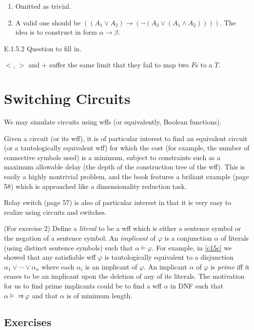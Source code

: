 \begin{enumerate}[label=(\alph*)]
  \item Omitted as trivial.
  \item A valid one should be $((A_1\vee A_2)\rightarrow(\neg(A_3\vee(A_1\wedge A_2))))$. The idea is to construct in form $\alpha\rightarrow \beta$.
\end{enumerate}

\begin{exercise}{E.1.5.2}
  Question to fill in.
\end{exercise}

$<$, $>$ and $+$ suffer the same limit that they fail to map two $F$s to a $T$.

\section{Switching Circuits}

We may simulate circuits using wffs (or equivalently, Boolean functions).

Given a circuit (or its wff), it is of particular interest to find an equivalent circuit (or a tautologically equivalent wff) for which the cost (for example, the number of connective symbols used) is a minimum, subject to constraints such as a maximum allowable delay (the depth of the construction tree of the wff). This is easily a highly nontrivial problem, and the book features a briliant example (page 58) which is approached like a dimensionality reduction task.

Relay switch (page 57) is also of particular interest in that it is very easy to realize using circuits and switches.

(For exercise 2) Define a \textit{literal} to be a wff which is either a sentence symbol or the negation of a sentence symbol. An \textit{implicant} of $\varphi$ is a conjunction $\alpha$ of literals (using distinct sentence symbols) such that $\alpha\vDash \varphi$. For example, in \ref{c15c} we showed that any satisfiable wff $\varphi$ is tautologically equivalent to a disjunction $\alpha_1\vee\cdots\vee \alpha_n$ where each $\alpha_i$ is an implicant of $\varphi$. An implicant $\alpha$ of $\varphi$ is \textit{prime} iff it ceases to be an implicant upon the deletion of any of its literals. The motivation for us to find prime implicants could be to find a wff $\alpha$ in DNF such that $\alpha\vDash\Dashv \varphi$ and that $\alpha$ is of minimum length.

\subsection*{Exercises}

